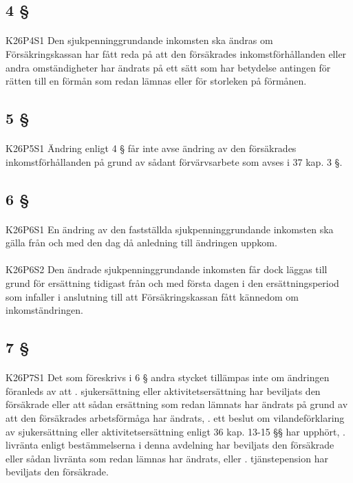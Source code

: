 \documentclass[a4paper,notitlepage,openany,10pt]{book}
\begin{document}
\subsection*{4 §}
\paragraph*{}
{\tiny K26P4S1}
Den sjukpenninggrundande inkomsten ska ändras om Försäkringskassan har fått reda på att den försäkrades inkomstförhållanden eller andra omständigheter har ändrats på ett sätt som har betydelse antingen för rätten till en förmån som redan lämnas eller för storleken på förmånen.
\subsection*{5 §}
\paragraph*{}
{\tiny K26P5S1}
Ändring enligt 4 § får inte avse ändring av den försäkrades inkomstförhållanden på grund av sådant förvärvsarbete som avses i 37 kap. 3 §.
\subsection*{6 §}
\paragraph*{}
{\tiny K26P6S1}
En ändring av den fastställda sjukpenninggrundande inkomsten ska gälla från och med den dag då anledning till ändringen uppkom.
\paragraph*{}
{\tiny K26P6S2}
Den ändrade sjukpenninggrundande inkomsten får dock läggas till grund för ersättning tidigast från och med första dagen i den ersättningsperiod som infaller i anslutning till att Försäkringskassan fått kännedom om inkomständringen.
\subsection*{7 §}
\paragraph*{}
{\tiny K26P7S1}
Det som föreskrivs i 6 § andra stycket tillämpas inte om ändringen föranleds av att
. sjukersättning eller aktivitetsersättning har beviljats den försäkrade eller att sådan ersättning som redan lämnats har ändrats på grund av att den försäkrades arbetsförmåga har ändrats,
. ett beslut om vilandeförklaring av sjukersättning eller aktivitetsersättning enligt 36 kap. 13-15 §§ har upphört,
. livränta enligt bestämmelserna i denna avdelning har beviljats den försäkrade eller sådan livränta som redan lämnas har ändrats, eller
. tjänstepension har beviljats den försäkrade.
\end{document}
